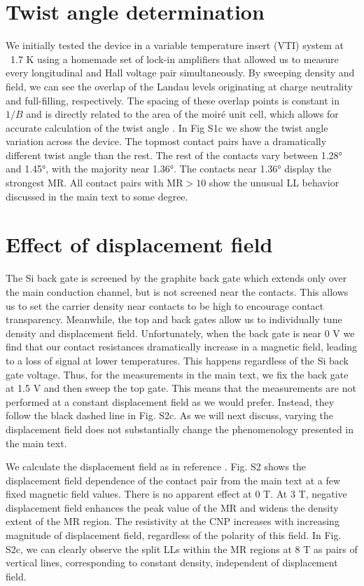\documentclass[12pt,twocolumn]{article}
\begin{document}
\section{Twist angle determination}
We initially tested the device in a variable temperature insert (VTI) system at ~1.7 K using a homemade set of lock-in amplifiers that allowed us to measure every longitudinal and Hall voltage pair simultaneously. By sweeping density and field, we can see the overlap of the Landau levels originating at charge neutrality and full-filling, respectively. The spacing of these overlap points is constant in $1/B$ and is directly related to the area of the moiré unit cell, which allows for accurate calculation of the twist angle \cite{caoCorrelatedInsulatorBehaviour2018}. In Fig S1c we show the twist angle variation across the device. The topmost contact pairs have a dramatically different twist angle than the rest. The rest of the contacts vary between 1.28° and 1.45°, with the majority near 1.36°. The contacts near 1.36° display the strongest MR. All contact pairs with $\mathrm{MR} > 10$ show the unusual LL behavior discussed in the main text to some degree.

\section{Effect of displacement field}
The Si back gate is screened by the graphite back gate which extends only over the main conduction channel, but is not screened near the contacts. This allows us to set the carrier density near contacts to be high to encourage contact transparency. Meanwhile, the top and back gates allow us to individually tune density and displacement field. Unfortunately, when the back gate is near 0 V we find that our contact resistances dramatically increase in a magnetic field, leading to a loss of signal at lower temperatures. This happens regardless of the Si back gate voltage. Thus, for the measurements in the main text, we fix the back gate at 1.5 V and then sweep the top gate. This means that the measurements are not performed at a constant displacement field as we would prefer. Instead, they follow the black dashed line in Fig. S2c. As we will next discuss, varying the displacement field does not substantially change the phenomenology presented in the main text.

We calculate the displacement field as in reference \cite{sharpeEmergentFerromagnetismThreequarters2019}. Fig. S2 shows the displacement field dependence of the contact pair from the main text at a few fixed magnetic field values. There is no apparent effect at 0 T. At 3 T, negative displacement field enhances the peak value of the MR and widens the density extent of the MR region. The resistivity at the CNP increases with increasing magnitude of displacement field, regardless of the polarity of this field. In Fig. S2c, we can clearly observe the split LLs within the MR regions at 8 T as pairs of vertical lines, corresponding to constant density, independent of displacement field.
\end{document}

